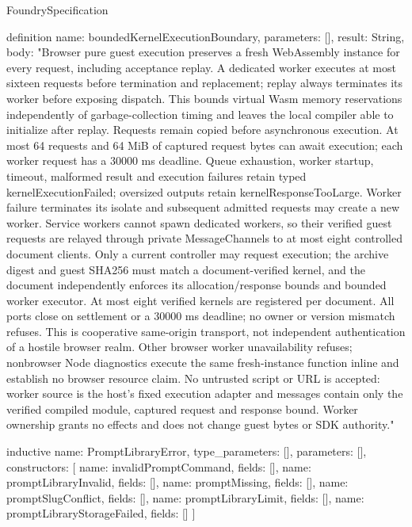 \begin{lexlean}{FoundrySpecification}
\begin{semanticmodule}
definition{
  name: boundedKernelExecutionBoundary,
  parameters: [],
  result: String,
  body: "Browser pure guest execution preserves a fresh WebAssembly instance for every request, including acceptance replay. A dedicated worker executes at most sixteen requests before termination and replacement; replay always terminates its worker before exposing dispatch. This bounds virtual Wasm memory reservations independently of garbage-collection timing and leaves the local compiler able to initialize after replay. Requests remain copied before asynchronous execution. At most 64 requests and 64 MiB of captured request bytes can await execution; each worker request has a 30000 ms deadline. Queue exhaustion, worker startup, timeout, malformed result and execution failures retain typed kernelExecutionFailed; oversized outputs retain kernelResponseTooLarge. Worker failure terminates its isolate and subsequent admitted requests may create a new worker. Service workers cannot spawn dedicated workers, so their verified guest requests are relayed through private MessageChannels to at most eight controlled document clients. Only a current controller may request execution; the archive digest and guest SHA256 must match a document-verified kernel, and the document independently enforces its allocation/response bounds and bounded worker executor. At most eight verified kernels are registered per document. All ports close on settlement or a 30000 ms deadline; no owner or version mismatch refuses. This is cooperative same-origin transport, not independent authentication of a hostile browser realm. Other browser worker unavailability refuses; nonbrowser Node diagnostics execute the same fresh-instance function inline and establish no browser resource claim. No untrusted script or URL is accepted: worker source is the host's fixed execution adapter and messages contain only the verified compiled module, captured request and response bound. Worker ownership grants no effects and does not change guest bytes or SDK authority."
}

inductive{
  name: PromptLibraryError,
  type_parameters: [],
  parameters: [],
  constructors: [
    {name: invalidPromptCommand, fields: []},
    {name: promptLibraryInvalid, fields: []},
    {name: promptMissing, fields: []},
    {name: promptSlugConflict, fields: []},
    {name: promptLibraryLimit, fields: []},
    {name: promptLibraryStorageFailed, fields: []}
  ]
}


\end{semanticmodule}
\end{lexlean}
